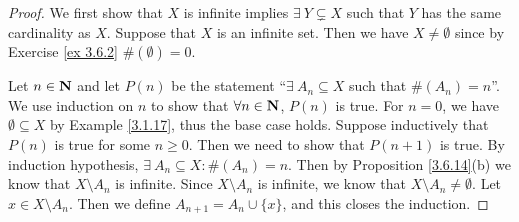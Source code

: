 \begin{proof}
    We first show that \(X\) is infinite implies \(\exists\ Y \subsetneq X\) such that \(Y\) has the same cardinality as \(X\).
    Suppose that \(X\) is an infinite set.
    Then we have \(X \neq \emptyset\) since by Exercise \ref{ex 3.6.2} \(\#(\emptyset) = 0\).

    Let \(n \in \mathbf{N}\) and let \(P(n)\) be the statement ``\(\exists\ A_n \subseteq X\) such that \(\#(A_n) = n\)''.
    We use induction on \(n\) to show that \(\forall n \in \mathbf{N}\), \(P(n)\) is true.
    For \(n = 0\), we have \(\emptyset \subseteq X\) by Example \ref{3.1.17}, thus the base case holds.
    Suppose inductively that \(P(n)\) is true for some \(n \geq 0\).
    Then we need to show that \(P(n + 1)\) is true.
    By induction hypothesis, \(\exists\ A_n \subseteq X : \#(A_n) = n\).
    Then by Proposition \ref{3.6.14}(b) we know that \(X \setminus A_n\) is infinite.
    Since \(X \setminus A_n\) is infinite, we know that \(X \setminus A_n \neq \emptyset\).
    Let \(x \in X \setminus A_n\).
    Then we define \(A_{n + 1} = A_n \cup \{x\}\), and this closes the induction.


\end{proof}
